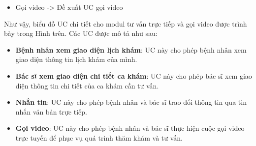 \begin{itemize}[nosep,leftmargin=*]
  \item Gọi video -> Đề xuất UC gọi video
\end{itemize}

Như vậy, biểu đồ UC chi tiết cho modul tư vấn trực tiếp và gọi video được trình bày trong Hình trên. Các UC được mô tả như sau:

\begin{itemize}[nosep,leftmargin=*]
  \item \textbf{Bệnh nhân xem giao diện lịch khám}: UC này cho phép bệnh nhân xem giao diện thông tin lịch khám của mình.
\end{itemize}

\begin{itemize}[nosep,leftmargin=*]
  \item \textbf{Bác sĩ xem giao diện chi tiết ca khám}: UC này cho phép bác sĩ xem giao diện thông tin chi tiết của ca khám cần tư vấn.
\end{itemize}

\begin{itemize}[nosep,leftmargin=*]
  \item \textbf{Nhắn tin}: UC này cho phép bệnh nhân và bác sĩ trao đổi thông tin qua tin nhắn văn bản trực tiếp.
\end{itemize}

\begin{itemize}[nosep,leftmargin=*]
  \item \textbf{Gọi video}: UC này cho phép bệnh nhân và bác sĩ thực hiện cuộc gọi video trực tuyến để phục vụ quá trình thăm khám và tư vấn.
\end{itemize}


